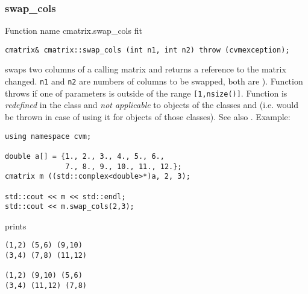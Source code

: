 \subsubsection{swap\_cols}
Function%
\pdfdest name {cmatrix.swap_cols} fit
\begin{verbatim}
cmatrix& cmatrix::swap_cols (int n1, int n2) throw (cvmexception);
\end{verbatim}
swaps two columns of a calling matrix and returns a reference to
the matrix changed. \verb"n1" and \verb"n2" are
numbers of columns to be swapped, 
both are \Based).
Function throws  
if one of  parameters is outside of the range
\verb"[1,nsize()]".
Function is \emph{redefined} in the class
 and
\emph{not applicable} to objects of the classes
 and
 (i.e. 
 would be thrown
in case of using it for objects of those classes).
See also .
Example:
\begin{Verbatim}
using namespace cvm;

double a[] = {1., 2., 3., 4., 5., 6.,
              7., 8., 9., 10., 11., 12.};
cmatrix m ((std::complex<double>*)a, 2, 3);

std::cout << m << std::endl;
std::cout << m.swap_cols(2,3);
\end{Verbatim}
prints
\begin{Verbatim}
(1,2) (5,6) (9,10)
(3,4) (7,8) (11,12)

(1,2) (9,10) (5,6)
(3,4) (11,12) (7,8)
\end{Verbatim}
\newpage




